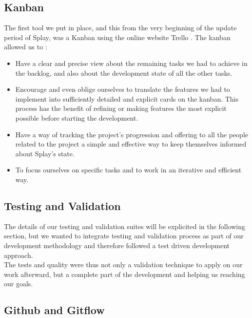 \documentclass{eplmastersthesis}
\begin{document}
        \subsection{Kanban}

          The first tool we put in place, and this from the very beginning of
          the update period of Splay, was a Kanban using the online website
          Trello \cite{trello}. The kanban allowed us to : \\

          \begin{itemize}
            \item Have a clear and precise view about the remaining tasks we had
            to achieve in the backlog, and also about the development state of
            all the other tasks.
            \item Encourage and even oblige ourselves to translate the features
            we had to implement into sufficiently detailed and explicit cards on
            the kanban. This process has the benefit of refining or making
            features the most explicit possible before starting the development.
            \item Have a way of tracking the project's progression and offering
            to all the people related to the project a simple and effective way
            to keep themselves informed about Splay's state.
            \item To focus ourselves on specific tasks and to work in an
            iterative and efficient way.
          \end{itemize}

        \subsection{Testing and Validation}

          The details of our testing and validation suites will be explicited
          in the following section, but we wanted to integrate testing and
          validation process as part of our development methodology and
          therefore followed a test driven development approach.\\
          The tests and quality were thus not only a validation technique to
          apply on our work afterward, but a complete part of the development
          and helping us reaching our goals.

        \subsection{Github and Gitflow}
\end{document}
